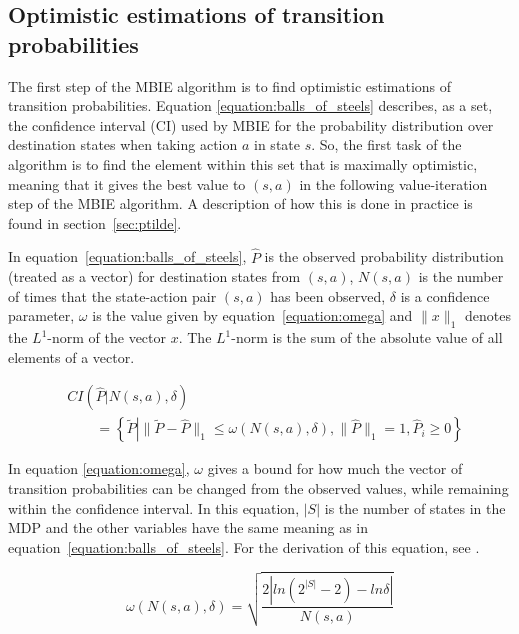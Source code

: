 \subsection{Optimistic estimations of transition probabilities}
\label{sec:computep}

The first step of the MBIE algorithm is to find optimistic estimations of
transition probabilities. Equation \eqref{equation:balls_of_steels} describes,
as a set, the confidence interval (CI) used by MBIE for the probability
distribution over destination states when taking action $a$ in state $s$. So,
the first task of the algorithm is to find the element within this set that is
maximally optimistic, meaning that it gives the best value to $(s,a)$ in the
following value-iteration step of the MBIE algorithm. A description of how this
is done in practice is found in section~\ref{sec:ptilde}. 

In equation~\eqref{equation:balls_of_steels}, $\hat{P}$ is the observed
probability distribution (treated as a vector) for destination states from
$(s,a)$, $N(s,a)$ is the number of times that the state-action pair $(s,a)$ has
been observed, $\delta$ is a confidence parameter,  $\omega$ is the value given
by equation~\eqref{equation:omega} and $\|x\|_1$ denotes the $L^1$-norm of the vector $x$.
The $L^1$-norm is the sum of the absolute value of all elements of a vector. 

\begin{align}
\label{equation:balls_of_steels}
& CI\left(\hat{P} \left| N(s, a), \delta\right.\right) \nonumber \\
& \qquad = \left\{\tilde{P} \left| \|\tilde{P} - \hat{P}\|_1 \le \omega(N(s,a), \delta), \|\hat{P}\|_1 = 1, \hat{P}_i \geq 0  \right.\right\}
\end{align}

In equation \eqref{equation:omega}, $\omega$ gives a bound for how much the
vector of transition probabilities can be changed from the observed values,
while remaining within the confidence interval. In this equation, $|S|$ is the
number of states in the MDP and the other variables have the same meaning as in
equation~\eqref{equation:balls_of_steels}. For the derivation of this equation,
see \textcite{Strehl20081309}.

\begin{equation}
\label{equation:omega}
   \omega(N(s,a),\delta) = {\sqrt{\frac{2|ln(2^{|S|}-2) - ln  \delta |}{N(s,a)}}}
\end{equation}
